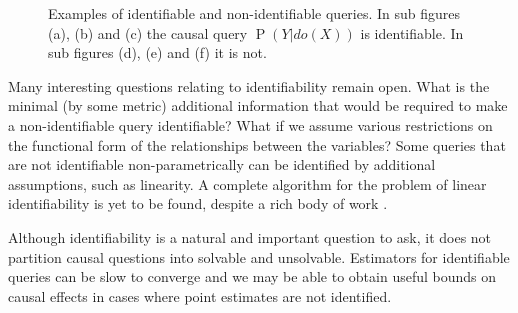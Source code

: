 \documentclass[11pt,a4paper,twoside]{report}
\renewcommand{\P}[1]{\operatorname{P}\left(#1\right)}
\theoremstyle{plain}
\theoremstyle{definition}
\begin{document}
\begin{figure}[ht]
\begin{subfigure}[t]{0.29\textwidth}
\centering
\vspace*{.5cm}
\caption{}
\label{fig:nid2_instrumental_variable}
\end{subfigure}
\begin{subfigure}[t]{0.29\textwidth}
\centering
\vspace*{.5cm}
\caption{}
\label{fig:nid3}
\end{subfigure}
\caption{Examples of identifiable and non-identifiable queries. In sub figures (a), (b) and (c) the causal query $\P{Y|do(X)}$ is identifiable. In sub figures (d), (e) and (f) it is not.}
\label{fig:identify}
\end{figure}


Many interesting questions relating to identifiability remain open. What is the minimal (by some metric) additional information that would be required to make a non-identifiable query identifiable? What if we assume various restrictions on the functional form of the relationships between the variables? Some queries that are not identifiable non-parametrically can be identified by additional assumptions, such as linearity. A complete algorithm for the problem of linear identifiability is yet to be found, despite a rich body of work \citep{Chen2016,tian2009parameter,drton2011global}.

Although identifiability is a natural and important question to ask, it does not partition causal questions into solvable and unsolvable. Estimators for identifiable queries can be slow to converge and we may be able to obtain useful bounds on causal effects in cases where point estimates are not identified.
\end{document}
